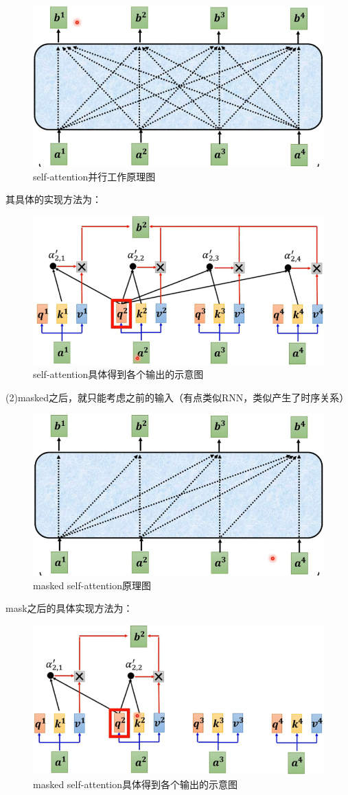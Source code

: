 \documentclass[AutoFakeBold]{MyFormat}
\begin{document}
\begin{figure}[!h]
    \centering
    \includegraphics[width=0.6\linewidth]{figures/2022.05.24/pic2.png}
    \caption{self-attention并行工作原理图}
\end{figure}

\par 其具体的实现方法为：

\begin{figure}[!h]
    \centering
    \includegraphics[width=0.6\linewidth]{figures/2022.05.24/pic3.png}
    \caption{self-attention具体得到各个输出的示意图}
\end{figure}

\par (2)masked之后，就只能考虑之前的输入（有点类似RNN，类似产生了时序关系）

\begin{figure}[!h]
    \centering
    \includegraphics[width=0.6\linewidth]{figures/2022.05.24/pic4.png}
    \caption[]{masked self-attention原理图}
\end{figure}

\par mask之后的具体实现方法为：

\begin{figure}[!h]
    \centering
    \includegraphics[width=0.6\linewidth]{figures/2022.05.24/pic5.png}
    \caption[]{masked self-attention具体得到各个输出的示意图}
\end{figure}
\end{document}
